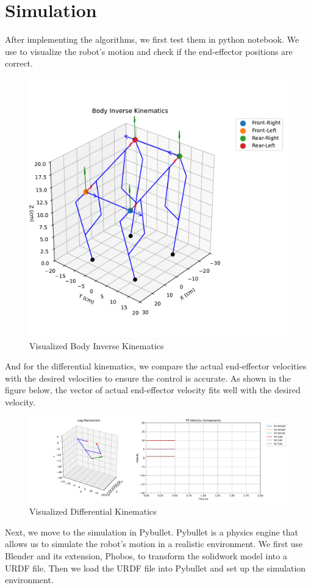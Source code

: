 \documentclass[a4paper,11pt]{article}
\begin{document}
\section{Simulation}

After implementing the algorithms, we first test them in python notebook.
We use  to visualize the robot's motion and check if the end-effector positions are correct.

\begin{figure}[H]
  \centering
	\includegraphics[width=0.55\linewidth]{../../assets/body_inverse_kinematics.pdf}
  \caption{Visualized Body Inverse Kinematics}
  \label{fig:body}
\end{figure}

And for the differential kinematics, we compare the actual end-effector velocities with the desired velocities to ensure the control is accurate.
As shown in the figure below, the vector of actual end-effector velocity fits well with the desired velocity.

\begin{figure}[H]
  \centering
	\includegraphics[width=\linewidth]{../../assets/differential_kinematics.pdf}
  \caption{Visualized Differential Kinematics}
  \label{fig:diff}
\end{figure}

Next, we move to the simulation in Pybullet.
Pybullet is a physics engine that allows us to simulate the robot's motion in a realistic environment.
We first use Blender and its extension, Phobos, to transform the solidwork model into a URDF file.
Then we load the URDF file into Pybullet and set up the simulation environment.
\end{document}
